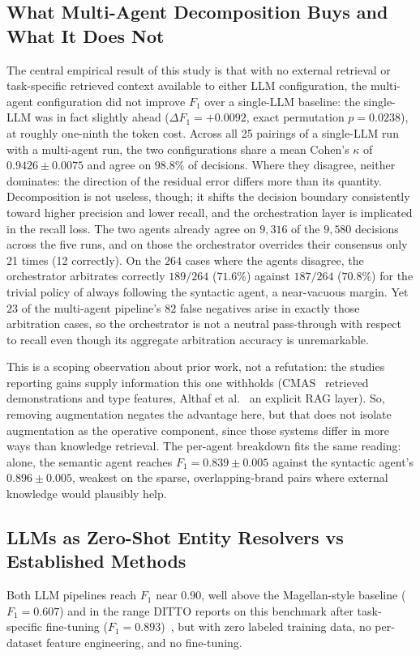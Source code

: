 \documentclass[sigconf]{acmart}
\begin{document}
\subsection{What Multi-Agent Decomposition Buys and What It Does Not}
The central empirical result of this study is that with no external retrieval or task-specific retrieved context available to either LLM configuration, the multi-agent configuration did not improve $F_1$ over a single-LLM baseline: the single-LLM was in fact slightly ahead ($\Delta F_1 = +0.0092$, exact permutation $p = 0.0238$), at roughly one-ninth the token cost.
Across all 25 pairings of a single-LLM run with a multi-agent run, the two configurations share a mean Cohen's $\kappa$ of $0.9426 \pm 0.0075$ and agree on $98.8\%$ of decisions.
Where they disagree, neither dominates: the direction of the residual error differs more than its quantity.
Decomposition is not useless, though; it shifts the decision boundary consistently toward higher precision and lower recall, and the orchestration layer is implicated in the recall loss.
The two agents already agree on $9{,}316$ of the $9{,}580$ decisions across the five runs, and on those the orchestrator overrides their consensus only 21 times (12 correctly).
On the $264$ cases where the agents disagree, the orchestrator arbitrates correctly $189/264$ ($71.6\%$) against $187/264$ ($70.8\%$) for the trivial policy of always following the syntactic agent, a near-vacuous margin. Yet $23$ of the multi-agent pipeline's $82$ false negatives arise in exactly those arbitration cases, so the orchestrator is not a neutral pass-through with respect to recall even though its aggregate arbitration accuracy is unremarkable.

This is a scoping observation about prior work, not a refutation: the studies reporting gains supply information this one withholds (CMAS~\cite{wang2025cooperative} retrieved demonstrations and type features, Althaf et al.~\cite{althaf2025multi} an explicit RAG layer).
So, removing augmentation negates the advantage here, but that does not isolate augmentation as the operative component, since those systems differ in more ways than knowledge retrieval.
The per-agent breakdown fits the same reading: alone, the semantic agent reaches $F_1 = 0.839 \pm 0.005$ against the syntactic agent's $0.896 \pm 0.005$, weakest on the sparse, overlapping-brand pairs where external knowledge would plausibly help.

\subsection{LLMs as Zero-Shot Entity Resolvers vs Established Methods}
Both LLM pipelines reach $F_1$ near 0.90, well above the Magellan-style baseline ($F_1 = 0.607$) and in the range DITTO reports on this benchmark after task-specific fine-tuning ($F_1 = 0.893$)~\cite{li2020deep}, but with zero labeled training data, no per-dataset feature engineering, and no fine-tuning.
\end{document}
